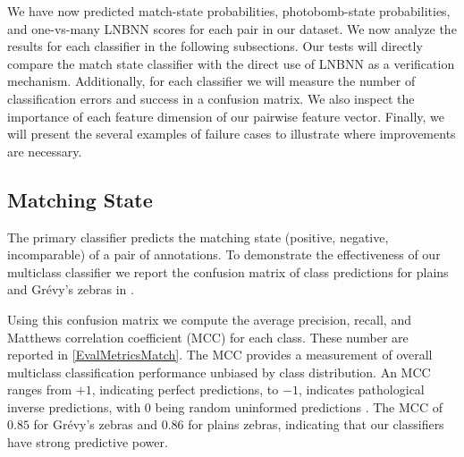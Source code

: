     We have now predicted match-state probabilities, photobomb-state
      probabilities, and one-vs-many LNBNN scores for each pair in our dataset.
    We now analyze the results for each classifier in the following
      subsections.
    Our tests will directly compare the match state classifier with the direct
      use of LNBNN as a verification mechanism.
    Additionally, for each classifier we will measure the number of
      classification errors and success in a confusion matrix.
    We also inspect the importance of each feature dimension of our pairwise
      feature vector.
    Finally, we will present the several examples of failure cases to
      illustrate where improvements are necessary.




    \subsection{Matching State}

        The primary classifier predicts the matching state (positive,
          negative, incomparable) of a pair of annotations.
        To demonstrate the effectiveness of our multiclass classifier we
          report the confusion matrix of class predictions for plains and
          Grévy's zebras in .

        \ConfusionMatch{}

        \EvalMetricsMatch{}

        Using this confusion matrix we compute the average precision, recall,
          and Matthews correlation coefficient (MCC) for each class.
        These number are reported in \cref{EvalMetricsMatch}.
        The MCC provides a measurement of overall multiclass classification
          performance unbiased by class distribution.
        An MCC ranges from $+1$, indicating perfect predictions, to $-1$,
          indicates pathological inverse predictions, with $0$ being random
          uninformed predictions \cite{powers_evaluation_2011}.
        The MCC of $0.85$ for Grévy's zebras and $0.86$ for plains zebras,
          indicating that our classifiers have strong predictive power.
        

